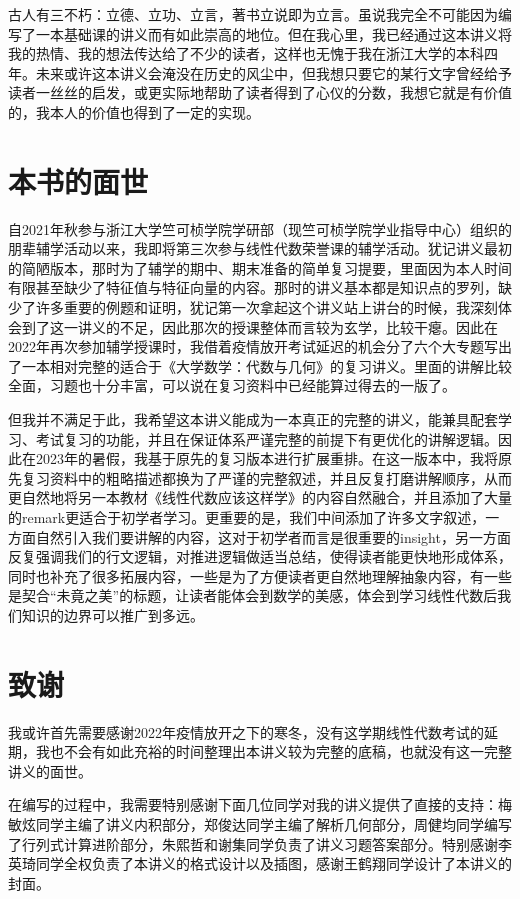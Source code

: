 古人有三不朽：立德、立功、立言，著书立说即为立言。虽说我完全不可能因为编写了一本基础课的讲义而有如此崇高的地位。但在我心里，我已经通过这本讲义将我的热情、我的想法传达给了不少的读者，这样也无愧于我在浙江大学的本科四年。未来或许这本讲义会淹没在历史的风尘中，但我想只要它的某行文字曾经给予读者一丝丝的启发，或更实际地帮助了读者得到了心仪的分数，我想它就是有价值的，我本人的价值也得到了一定的实现。

\section*{本书的面世}

自2021年秋参与浙江大学竺可桢学院学研部（现竺可桢学院学业指导中心）组织的朋辈辅学活动以来，我即将第三次参与线性代数荣誉课的辅学活动。犹记讲义最初的简陋版本，那时为了辅学的期中、期末准备的简单复习提要，里面因为本人时间有限甚至缺少了特征值与特征向量的内容。那时的讲义基本都是知识点的罗列，缺少了许多重要的例题和证明，犹记第一次拿起这个讲义站上讲台的时候，我深刻体会到了这一讲义的不足，因此那次的授课整体而言较为玄学，比较干瘪。因此在2022年再次参加辅学授课时，我借着疫情放开考试延迟的机会分了六个大专题写出了一本相对完整的适合于《大学数学：代数与几何》的复习讲义。里面的讲解比较全面，习题也十分丰富，可以说在复习资料中已经能算过得去的一版了。

但我并不满足于此，我希望这本讲义能成为一本真正的完整的讲义，能兼具配套学习、考试复习的功能，并且在保证体系严谨完整的前提下有更优化的讲解逻辑。因此在2023年的暑假，我基于原先的复习版本进行扩展重排。在这一版本中，我将原先复习资料中的粗略描述都换为了严谨的完整叙述，并且反复打磨讲解顺序，从而更自然地将另一本教材《线性代数应该这样学》的内容自然融合，并且添加了大量的remark更适合于初学者学习。更重要的是，我们中间添加了许多文字叙述，一方面自然引入我们要讲解的内容，这对于初学者而言是很重要的insight，另一方面反复强调我们的行文逻辑，对推进逻辑做适当总结，使得读者能更快地形成体系，同时也补充了很多拓展内容，一些是为了方便读者更自然地理解抽象内容，有一些是契合``未竟之美''的标题，让读者能体会到数学的美感，体会到学习线性代数后我们知识的边界可以推广到多远。

\section*{致谢}

我或许首先需要感谢2022年疫情放开之下的寒冬，没有这学期线性代数考试的延期，我也不会有如此充裕的时间整理出本讲义较为完整的底稿，也就没有这一完整讲义的面世。

在编写的过程中，我需要特别感谢下面几位同学对我的讲义提供了直接的支持：梅敏炫同学主编了讲义内积部分，郑俊达同学主编了解析几何部分，周健均同学编写了行列式计算进阶部分，朱熙哲和谢集同学负责了讲义习题答案部分。特别感谢李英琦同学全权负责了本讲义的格式设计以及插图，感谢王鹤翔同学设计了本讲义的封面。

